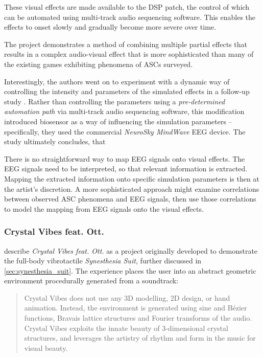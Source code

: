 These visual effects are made available to the \ac{DSP} patch, the control of which can be automated using multi-track audio sequencing software. This enables the effects to onset slowly and gradually become more severe over time.

The project demonstrates a method of combining multiple partial effects that results in a complex audio-visual effect that is more sophisticated than many of the existing games exhibiting phenomena of \acp{ASC} surveyed.

Interestingly, the authors went on to experiment with a dynamic way of controlling the intensity and parameters of the simulated effects in a follow-up study \autocite{weinel2015quake}. Rather than controlling the parameters using a \textit{pre-determined automation path} via multi-track audio sequencing software, this modification introduced biosensor as a way of influencing the simulation parameters -- specifically, they used the commercial \textit{NeuroSky MindWave} \ac{EEG} device. The study ultimately concludes, that 

There is no straightforward way to map \ac{EEG} signals onto visual effects. The \ac{EEG} signals need to be interpreted, so that relevant information is extracted. Mapping the extracted information onto specific simulation parameters is then at the artist's discretion. A more sophisticated approach might examine correlations between observed \ac{ASC} phenomena and \ac{EEG} signals, then use those correlations to model the mapping from \ac{EEG} signals onto the visual effects.

\subsubsection{Crystal Vibes feat. Ott.}\label{sec:crystal_vibes}
\textcite{outram2017crystal} describe \textit{Crystal Vibes feat. Ott.} as a project originally developed to demonstrate the full-body vibrotactile \textit{Synesthesia Suit}, further discussed in \ref{sec:synesthesia_suit}. The experience places the user into an abstract geometric environment procedurally generated from a soundtrack:

\begin{quote}
    Crystal Vibes does not use any 3D modelling, 2D design, or hand animation. Instead, the environment is generated using sine and Bézier functions, Bravais lattice structures and Fourier transforms of the audio. Crystal Vibes exploits the innate beauty of 3-dimensional crystal structures, and leverages the artistry of rhythm and form in the music for visual beauty.
\end{quote}

